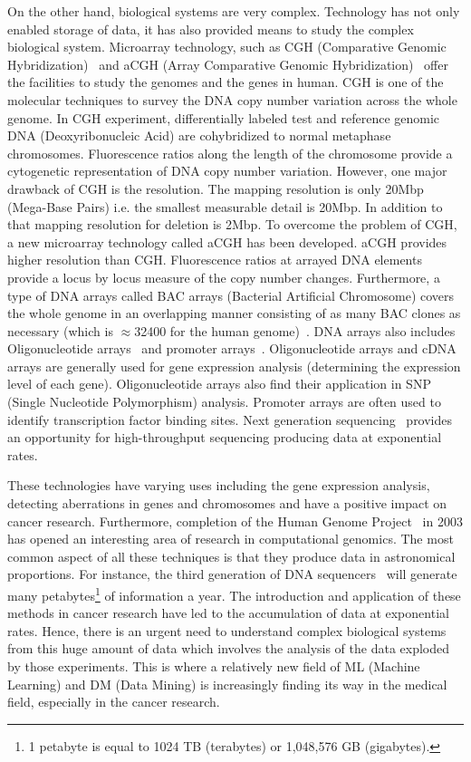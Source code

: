On the other hand, biological systems are very complex. Technology has not only enabled storage of data, it has also provided means to study the complex biological system. Microarray technology, such as CGH (Comparative Genomic Hybridization)~\cite{cgh} and aCGH (Array Comparative Genomic Hybridization)~\cite{acgh} offer the facilities to study the genomes and the genes in human. CGH is one of the molecular techniques to survey the DNA copy number variation across the whole genome. In CGH experiment, differentially labeled test and reference genomic DNA (Deoxyribonucleic Acid) are cohybridized to normal metaphase chromosomes. Fluorescence ratios along the length of the chromosome provide a cytogenetic representation of DNA copy number variation. However, one major drawback of CGH is the resolution. The mapping resolution is only 20Mbp (Mega-Base Pairs) i.e. the smallest measurable detail is 20Mbp. In addition to that mapping resolution for deletion is 2Mbp. To overcome the problem of CGH, a new microarray technology called aCGH has been developed. aCGH provides higher resolution than CGH. Fluorescence ratios at arrayed DNA elements provide a locus by locus measure of the copy number changes. Furthermore, a type of DNA arrays called BAC arrays (Bacterial Artificial Chromosome) covers the whole genome in an overlapping manner consisting of as many BAC clones as necessary (which is $\approx$32400 for the human genome)~\cite{bacdna}. DNA arrays also includes Oligonucleotide arrays~\cite{oligo} and promoter arrays~\cite{promoter}. Oligonucleotide arrays and cDNA arrays are generally used for gene expression analysis (determining the expression level of each gene). Oligonucleotide arrays also find their application in SNP (Single Nucleotide Polymorphism) analysis. Promoter arrays are often used to identify transcription factor binding sites. Next generation sequencing~\cite{nextgen, nextgen1, nextgen2} provides an opportunity for high-throughput sequencing producing data at exponential rates. 

These technologies have varying uses including the gene expression analysis, detecting aberrations in genes and chromosomes and have a positive impact on cancer research. Furthermore, completion of the Human Genome Project~\cite{humangenomeproject, humangenomeproject1} in 2003 has opened an interesting area of research in computational genomics. The most common aspect of all these techniques is that they produce data in astronomical proportions. For instance, the third generation of DNA sequencers~\cite{nextgen1, nextgen2} will generate many petabytes\footnote{1 petabyte is equal to 1024 TB (terabytes) or 1,048,576 GB (gigabytes).} of information a year. The introduction and application of these methods in cancer research have led to the accumulation of data at exponential rates. Hence, there is an urgent need to understand complex biological systems from this huge amount of data which involves the analysis of the data exploded by those experiments. This is where a relatively new field of ML (Machine Learning) and DM (Data Mining) is increasingly finding its way in the medical field, especially in the cancer research.

